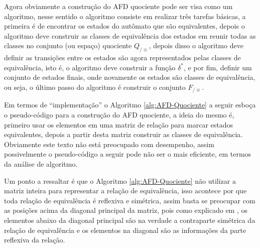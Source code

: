 Agora obviamente a construção do AFD quociente pode ser visa como um algoritmo, nesse sentido o algoritmo consiste em realizar três tarefas básicas, a primeira é de encontrar os estados do autômato que são equivalentes, depois o algoritmo deve construir as classes de equivalência dos estados em reunir todas as classes no conjunto (ou espaço) quociente $Q_{/\equiv}$, depois disso o algoritmo deve definir as transições entre  os estados são agora representados pelas classes de equivalência, isto é, o algoritmo deve construir a função $\delta^*$, e por fim, definir um conjunto de estados finais, onde novamente os estados são classes de equivalência, ou seja, o último passo do algoritmo é construir o conjunto $F_{/\equiv}$.

Em termos de ``implementação'' o Algoritmo \ref{alg:AFD-Quociente}  a seguir esboça o pseudo-código para a construção do AFD quociente, a ideia do mesmo é, primeiro usar os elementos em uma matriz de relação para marcar estados equivalentes, depois a partir desta matriz construir as classes de equivalência. Obviamente este texto não está preocupado com desempenho, assim possivelmente o pseudo-código a seguir pode não ser o mais eficiente, em termos da análise de algoritmo.

\begin{remark}
	Um ponto a ressaltar é que o Algoritmo \ref{alg:AFD-Quociente} não utilizar a matriz inteira para representar a relação de equivalência, isso acontece por que toda relação de equivalência é reflexiva e simétrica, assim basta se preocupar com as posições acima da diagonal principal da matriz, pois como explicado em \cite{benjaLivro2010}, os elementos abaixo da diagonal principal são na verdade a contraparte simétrica da relação de equivalência e os elementos na diagonal são as informações da parte reflexiva da relação.
\end{remark}

